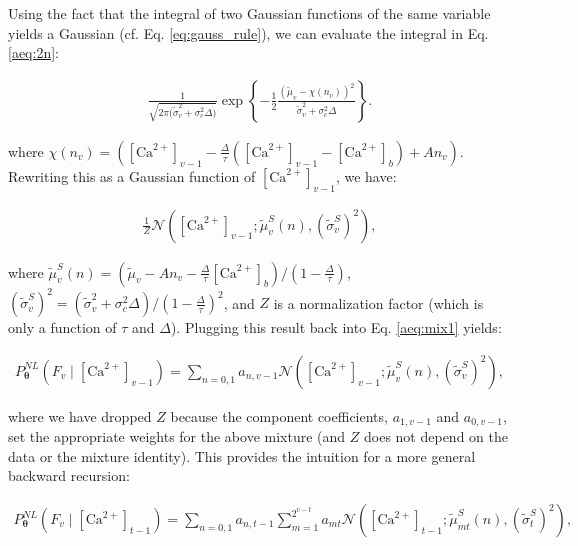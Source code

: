 \documentclass[10pt]{article}
\providecommand{\ve}[1]{\boldsymbol{#1}}
\providecommand{\ve}[1]{\boldsymbol{#1}}
\newcommand{\thetn}{\ve{\theta}}
\newcommand{\p}{P_{\thetn}}
\newcommand{\Ca}{[\text{Ca}^{2+}]}
\begin{document}
\noindent Using the fact that the integral of two Gaussian functions of the same variable yields a Gaussian (cf. Eq. \ref{eq:gauss_rule}), we can evaluate the integral in Eq. \ref{aeq:2n}:

\begin{align}
\frac{1}{\sqrt{2 \pi \big(\widetilde{\sigma}_v^2 + \sigma_c^2 \Delta\big)}} \exp \left\{-\frac{1}{2} \frac{\left( \widetilde{\mu}_v - \chi(n_v)\right)^2}{ \widetilde{\sigma}_v^2 + \sigma_c^2 \Delta}\right\}.
\end{align}

\noindent where $\chi(n_v)= (\Ca_{v-1} -\frac{\Delta}{\tau} (\Ca_{v-1} - \Ca_b) + A n_v)$. Rewriting this as a Gaussian function of $\Ca_{v-1}$, we have:

\begin{align}
\frac{1}{Z} \mathcal{N} \left(\Ca_{v-1}; \widetilde{\mu}^S_v(n), (\widetilde{\sigma}_v^S)^2\right),
\end{align}

\noindent where  $\widetilde{\mu}^S_v(n)= (\widetilde{\mu}_v - A n_v - \frac{\Delta}{\tau} \Ca_b)/(1-\frac{\Delta}{\tau})$, $ (\widetilde{\sigma}_v^S)^2=(\widetilde{\sigma}_v^2 + \sigma_c^2 \Delta)/(1-\frac{\Delta}{\tau})^2$, and  $Z$ is a normalization factor (which is only a function of $\tau$ and $\Delta$).  Plugging this result back into Eq. \ref{aeq:mix1} yields:

\begin{align}
\p^{NL}(F_v \mid \Ca_{v-1}) = \sum_{n=0,1} a_{n,v-1}  \mathcal{N} \left(\Ca_{v-1}; \widetilde{\mu}^{S}_v(n), (\widetilde{\sigma}_v^S)^2 \right),%
\end{align}

\noindent where we have dropped $Z$ because the component coefficients, $a_{1,v-1}$ and $a_{0,v-1}$, set the appropriate weights for the above mixture (and $Z$ does not depend on the data or the mixture identity).  This provides the intuition for a more general backward recursion:

\begin{align} \label{aeq:mix_approx0}
\p^{NL}(F_v \mid \Ca_{t-1}) = \sum_{n=0,1} a_{n,t-1}
\sum_{m=1}^{2^{v-t}} a_{mt} \mathcal{N}\left(\Ca_{t-1}; \widetilde{\mu}^{S}_{mt}(n),(\widetilde{\sigma}^S_t)^2 \right), %
\end{align}
\end{document}

